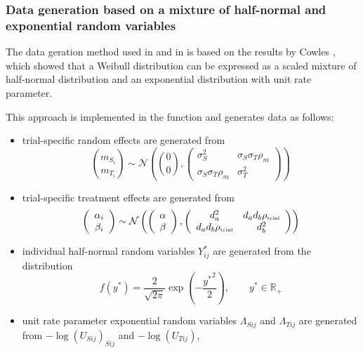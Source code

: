 \documentclass[]{scrartcl}\usepackage[]{graphicx}\usepackage[]{color}
\begin{document}
{{\subsubsection{Data generation based on a mixture of half-normal and exponential random variables}
The data geration method used in \cite{ShiEtal11}
  and in \cite{RenfroEtal12} is based on the results by Cowles \cite{Cowles04},
  which showed that a Weibull distribution can be expressed as a scaled mixture
  of half-normal distribution and an exponential distribution
  with unit rate parameter.

This approach is implemented in the function 
  and generates data as follows:
  \begin{itemize}
    \item trial-specific random effects are generated from
      $$
        \binom{m_{S_i}}{m_{T_i}} \sim \mathcal N \left(
        \binom00, \left(\begin{array}{cc}
          \sigma^2_S & \sigma_S\sigma_T\rho_m \\
          \sigma_S\sigma_T\rho_m &  \sigma^2_T
        \end{array}\right)
        \right)
      $$
    \item trial-specific treatment effects are generated from
      $$
        \left(\begin{array}{c} 
        {\alpha_i}\\ {\beta_i}\end{array}\right)
          \sim \mathcal N
          \left(
        \left(\begin{array}{c}
        \alpha\\ \beta\end{array}\right), 
        \left(\begin{array}{cc} 
          d_a^2 &
          d_a d_b{\rho_\text{\tiny trial}} \\
          d_a d_b{\rho_\text{\tiny trial}} &
          d_b^2 \\
        \end{array}\right)
        \right)
      $$
    \item individual half-normal random variables $Y^\ast_{ij}$ 
      are generated from the distribution
      $$
        f(y^\ast) = \frac2{\sqrt{2\pi}} \exp\left(-\frac{{y^\ast}^2}2\right),
        \qquad y^\ast \in \mathbb R_+
      $$
    \item unit rate parameter exponential random variables
      $\Lambda_{Sij}$ and  $\Lambda_{Tij}$ are generated from
      $-\log(U_{Sij})_{Sij}$ and $-\log(U_{Tij})$,

\end{itemize}}}
\end{document}
